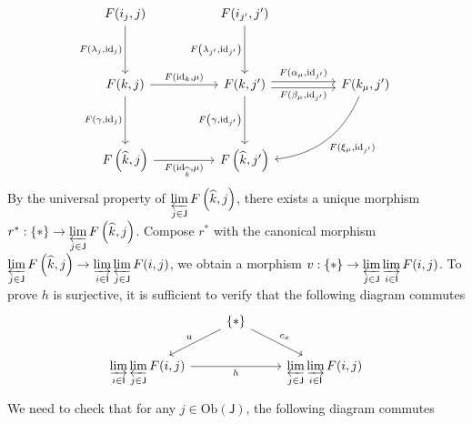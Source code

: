 \begin{prf}
\begin{enumerate}[(i)]
\[\begin{tikzcd}
{F(i_j,j)} \arrow[d, "{F\left(\lambda_j,\mathrm{id}_j\right)}"']                                     &                                               & {F(i_{j'},j')} \arrow[d, "{F\left(\lambda_{j'},\mathrm{id}_{j'}\right)}"']                                                                                                             &  &                                                                       \\[2em]
{F(k,j)} \arrow[d, "{F\left(\gamma,\mathrm{id}_j\right)}"'] \arrow[rr, "{F(\mathrm{id}_{{k}},\mu)}"] &                                               & {F(k,j')} \arrow[d, "{F\left(\gamma,\mathrm{id}_{j'}\right)}"'] \arrow[rr, "{F(\alpha_\mu,\mathrm{id}_{j'})}", shift left] \arrow[rr, "{F(\beta_\mu,\mathrm{id}_{j'})}"', shift right] &  & {F(k_\mu,j')} \arrow[lld, "{F(\xi_\mu,\mathrm{id}_{j'})}", bend left] \\[2em]
{ F\left(\widehat{k} ,j\right)} \arrow[rr, "{F(\mathrm{id}_{\widehat{k}},\mu)}"']                    &                                               & { F\left(\widehat{k} ,j'\right)}                                                                                                                                                       &  &                                                                      
\end{tikzcd}
        \]
        By the universal property of $\varprojlim\limits_{j\in\mathsf{J}} F\left(\widehat{k} ,j\right)$, there exists a unique morphism $r^*:\{*\}\to \varprojlim\limits_{j\in\mathsf{J}} F\left(\widehat{k} ,j\right)$. Compose $r^*$ with the canonical morphism $\varprojlim\limits_{j\in\mathsf{J}} F\left(\widehat{k} ,j\right)\to \varinjlim\limits_{i\in\mathsf{I}}\varprojlim\limits_{j\in\mathsf{J}} F(i,j)$, we obtain a morphism $v:\{*\}\to \varprojlim\limits_{j\in\mathsf{J}} \varinjlim\limits_{i\in\mathsf{I}} F(i,j)$. To prove $h$ is surjective, it is sufficient to verify that the following diagram commutes
        \[
            \begin{tikzcd}
                & \{*\} \arrow[ld, "u"'] \arrow[rd, "c_x"] &                                                                                 \\
{\varinjlim\limits_{i\in\mathsf{I}}\varprojlim\limits_{j\in\mathsf{J}} F(i,j)} \arrow[rr, "h"'] &                                          & {\varprojlim\limits_{j\in\mathsf{J}} \varinjlim\limits_{i\in\mathsf{I}} F(i,j)}
\end{tikzcd}
\]
We need to check that for any $j \in \mathrm{Ob}\left(\mathsf{J}\right)$, the following diagram commutes

\end{enumerate}
\end{prf}

